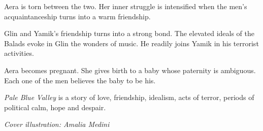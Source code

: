 \documentclass[
  spinewidth=0.8325in,
  coverwidth=6in,
  coverheight=9in,
  marklength=0.125in,
  bleedwidth=0.125in,
  12pt
]{bookcover}
\begin{document}
\begin{bookcover}
{{Aera is torn between the two. Her inner struggle is intensified when
the men's acquaintanceship turns into a warm friendship.

Glin and Yamik's friendship turns into a strong bond. The elevated
ideals of the Balads evoke in Glin the wonders of music. He readily
joins Yamik in his terrorist activities.

Aera becomes pregnant. She gives birth to a baby whose paternity is
ambiguous. Each one of the men believes the baby to be his.

\emph{Pale Blue Valley} is a story of love, friendship, idealism, acts of
terror, periods of political calm, hope and despair.

\textit{Cover illustration: Amalia Medini}
    }

}


\end{bookcover}
\end{document}
